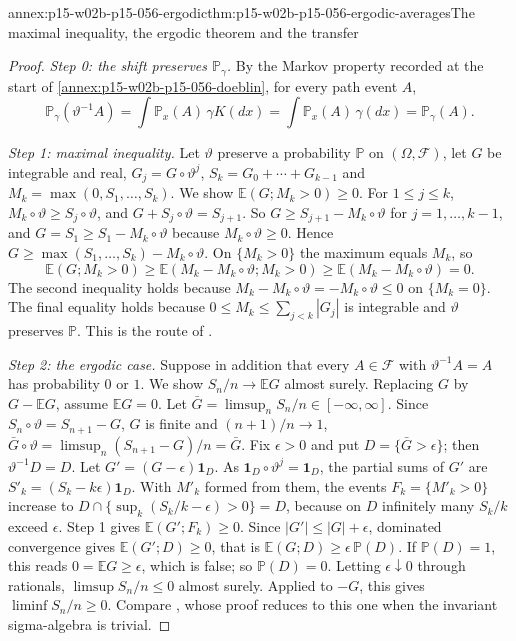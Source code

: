 \begin{annexitem}{annex:p15-w02b-p15-056-ergodic}{thm:p15-w02b-p15-056-ergodic-averages}{The maximal inequality, the ergodic theorem and the transfer}
\begin{proof}
\emph{Step 0: the shift preserves \(\mathbb P_\gamma\).} By the Markov
property recorded at the start of
\cref{annex:p15-w02b-p15-056-doeblin}, for every path event \(A\),
\[
 \mathbb P_\gamma(\vartheta^{-1}A)=\int\mathbb P_x(A)\,\gamma K(dx)
 =\int\mathbb P_x(A)\,\gamma(dx)=\mathbb P_\gamma(A).
\]

\emph{Step 1: maximal inequality.} Let \(\vartheta\) preserve a probability
\(\mathbb P\) on \((\Omega,\mathcal F)\), let \(G\) be integrable and real,
\(G_j=G\circ\vartheta^j\), \(S_k=G_0+\cdots+G_{k-1}\) and
\(M_k=\max(0,S_1,\ldots,S_k)\). We show \(\mathbb E(G;M_k>0)\geq0\). For
\(1\leq j\leq k\), \(M_k\circ\vartheta\geq S_j\circ\vartheta\), and
\(G+S_j\circ\vartheta=S_{j+1}\). So \(G\geq S_{j+1}-M_k\circ\vartheta\) for
\(j=1,\ldots,k-1\), and \(G=S_1\geq S_1-M_k\circ\vartheta\) because
\(M_k\circ\vartheta\geq0\). Hence
\(G\geq\max(S_1,\ldots,S_k)-M_k\circ\vartheta\). On \(\{M_k>0\}\) the
maximum equals \(M_k\), so
\[
 \mathbb E(G;M_k>0)\geq\mathbb E(M_k-M_k\circ\vartheta;M_k>0)
 \geq\mathbb E(M_k-M_k\circ\vartheta)=0 .
\]
The second inequality holds because \(M_k-M_k\circ\vartheta=-M_k\circ\vartheta\leq0\)
on \(\{M_k=0\}\). The final equality holds because
\(0\leq M_k\leq\sum_{j<k}|G_j|\) is integrable and \(\vartheta\) preserves
\(\mathbb P\). This is the route of
\cite[Lemma~6.2.2, p.~335]{DurrettPTEAuthor2019}.

\emph{Step 2: the ergodic case.} Suppose in addition that every
\(A\in\mathcal F\) with \(\vartheta^{-1}A=A\) has probability \(0\) or
\(1\). We show \(S_n/n\to\mathbb EG\) almost surely. Replacing \(G\) by
\(G-\mathbb EG\), assume \(\mathbb EG=0\). Let
\(\bar G=\limsup_nS_n/n\in[-\infty,\infty]\). Since
\(S_n\circ\vartheta=S_{n+1}-G\), \(G\) is finite and \((n+1)/n\to1\),
\(\bar G\circ\vartheta=\limsup_n(S_{n+1}-G)/n=\bar G\). Fix \(\epsilon>0\)
and put \(D=\{\bar G>\epsilon\}\); then \(\vartheta^{-1}D=D\). Let
\(G'=(G-\epsilon)\mathbf 1_D\). As \(\mathbf 1_D\circ\vartheta^j=\mathbf 1_D\),
the partial sums of \(G'\) are \(S'_k=(S_k-k\epsilon)\mathbf 1_D\). With
\(M'_k\) formed from them, the events \(F_k=\{M'_k>0\}\) increase to
\(D\cap\{\sup_k(S_k/k-\epsilon)>0\}=D\), because on \(D\) infinitely many
\(S_k/k\) exceed \(\epsilon\). Step 1 gives \(\mathbb E(G';F_k)\geq0\).
Since \(|G'|\leq|G|+\epsilon\), dominated convergence gives
\(\mathbb E(G';D)\geq0\), that is
\(\mathbb E(G;D)\geq\epsilon\,\mathbb P(D)\). If \(\mathbb P(D)=1\), this
reads \(0=\mathbb EG\geq\epsilon\), which is false; so \(\mathbb P(D)=0\).
Letting \(\epsilon\downarrow0\) through rationals,
\(\limsup S_n/n\leq0\) almost surely. Applied to \(-G\), this gives
\(\liminf S_n/n\geq0\). Compare
\cite[Theorem~6.2.1, pp.~335--336]{DurrettPTEAuthor2019}, whose proof
reduces to this one when the invariant sigma-algebra is trivial.


\end{proof}
\end{annexitem}
